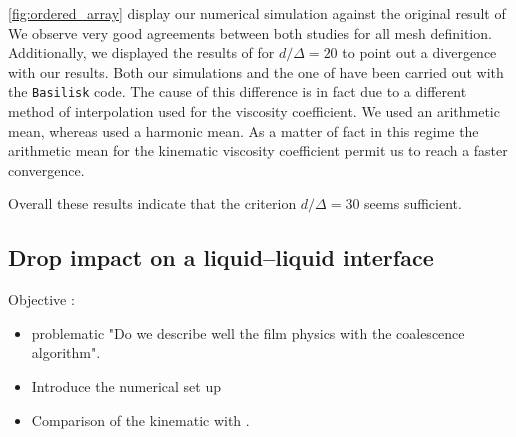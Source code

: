 \ref{fig:ordered_array} display our numerical simulation against the original result of \citet{esmaeeli1999direct}
We observe very good agreements between both studies for all mesh definition.
Additionally, we displayed the results of \citet{innocenti2020direct} for $d/\Delta = 20$ to point out a divergence with our results.  
Both our simulations and the one of \citet{innocenti2020direct} have been carried out with the  \texttt{Basilisk} code. 
The cause of this difference is in fact due to a different method of interpolation used for the viscosity coefficient. 
We used an arithmetic mean, whereas \citet{innocenti2020direct} used a 
harmonic mean. 
As a matter of fact in this regime the arithmetic mean for the kinematic viscosity coefficient permit us to reach a faster convergence. 

Overall these results indicate that the criterion $d/\Delta = 30$ seems sufficient.

\subsection{Drop impact on a liquid–liquid interface}
Objective : 
\begin{itemize}
    \item problematic "Do we describe well the film physics with the coalescence algorithm".
    \item Introduce the numerical set up 
    \item Comparison of the kinematic with \citet{mohamed2003drop}.  
\end{itemize}

